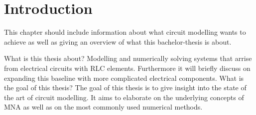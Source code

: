 \chapter{Introduction}
	This chapter should include information about what circuit modelling wants to achieve as well as giving an overview of what this bachelor-thesis is about.

What is this thesis about? \newline
	Modelling and numerically solving systems that arrise from electrical circuits with RLC elements. Furthermore it will briefly discuss on expanding this baseline with more complicated electrical components.
What is the goal of this thesis?\newline
	The goal of this thesis is to give insight into the state of the art of circuit modelling. It aims to elaborate on the underlying concepts of MNA as well as on the most commonly used numerical methods.